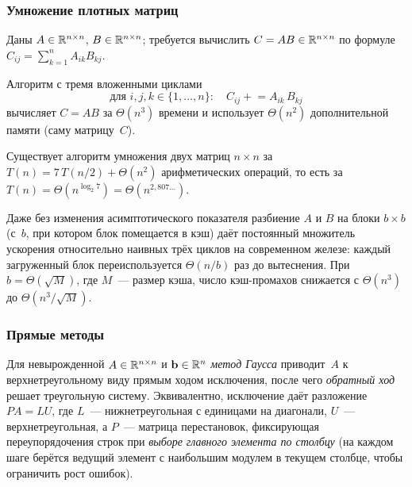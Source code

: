 \subsubsection*{Умножение плотных матриц}

Даны $A \in \mathbb{R}^{n \times n}$, $B \in \mathbb{R}^{n \times n}$; требуется
вычислить $C = AB \in \mathbb{R}^{n \times n}$ по формуле
$C_{ij} = \sum_{k=1}^{n} A_{ik} B_{kj}$.

\begin{proposition}
\label{prop:naive-matmul}
Алгоритм с тремя вложенными циклами
\[
  \text{для } i, j, k \in \{1, \dots, n\}\colon\quad C_{ij} \mathrel{+}= A_{ik}\, B_{kj}
\]
вычисляет $C = AB$ за $\Theta(n^3)$ времени и использует
$\Theta(n^2)$ дополнительной памяти (саму матрицу~$C$).
\end{proposition}

\begin{theorem}[Штрассен, 1969]
\label{thm:strassen}
Существует алгоритм умножения двух матриц $n \times n$ за
$T(n) = 7\, T(n/2) + \Theta(n^2)$ арифметических операций, то есть за
$T(n) = \Theta(n^{\log_2 7}) = \Theta(n^{2{,}807\ldots})$.
\end{theorem}

\begin{remark}
Даже без изменения асимптотического показателя разбиение $A$ и $B$ на
блоки $b \times b$ (с~$b$, при котором блок помещается в кэш) даёт
постоянный множитель ускорения относительно наивных трёх циклов на
современном железе: каждый загруженный блок переиспользуется
$\Theta(n/b)$ раз до вытеснения. При $b = \Theta(\sqrt{M})$, где
$M$~--- размер кэша, число кэш-промахов снижается с $\Theta(n^3)$ до
$\Theta(n^3 / \sqrt{M})$.
\end{remark}

\subsubsection*{Прямые методы}

Для невырожденной $A \in \mathbb{R}^{n \times n}$ и $\mathbf{b} \in \mathbb{R}^n$
\emph{метод Гаусса} приводит~$A$ к верхнетреугольному виду прямым
ходом исключения, после чего \emph{обратный ход} решает треугольную
систему. Эквивалентно, исключение даёт разложение $P A = L U$, где
$L$~--- нижнетреугольная с единицами на диагонали, $U$~---
верхнетреугольная, а $P$~--- матрица перестановок, фиксирующая
переупорядочения строк при \emph{выборе главного элемента по
столбцу} (на каждом шаге берётся ведущий элемент с наибольшим модулем
в текущем столбце, чтобы ограничить рост ошибок).

